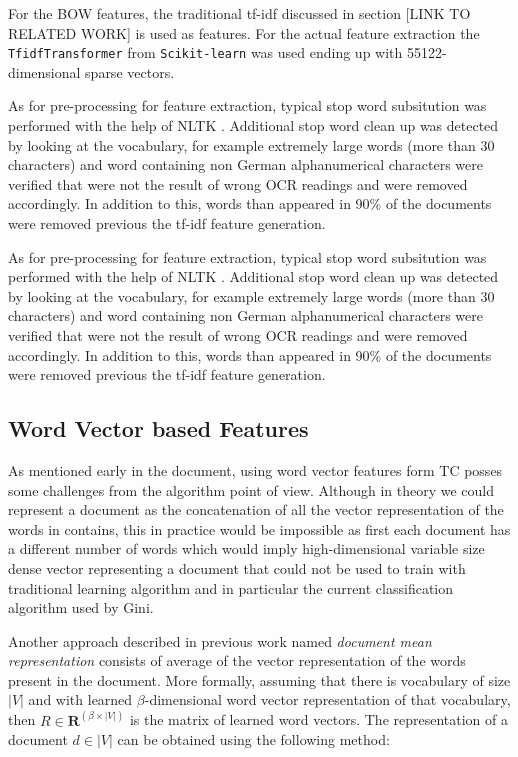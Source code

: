 For the \ac{BOW} features, the traditional \ac{tf-idf}  
\cite{Salton88term-weightingapproaches}\cite{Sebastiani02} discussed in
section [LINK TO RELATED WORK] is used as features. For the actual feature
extraction the \texttt{TfidfTransformer} from \texttt{Scikit-learn}
\cite{scikit-learn}  was used ending up with 55122-dimensional sparse
vectors.

As for  pre-processing for feature extraction,  typical stop word subsitution was performed with the help
of \ac{NLTK} \cite{BirdKleinLoper09}. Additional stop word clean up was
detected by looking at the vocabulary, for example extremely large words
(more than 30 characters) and word containing non German alphanumerical
characters were verified that were not the result of wrong OCR
readings and were removed accordingly. In addition to this, words than
appeared in 90\% of the documents were removed  previous the \ac{tf-idf}
feature generation.


As for  pre-processing for feature extraction,  typical stop word subsitution was performed with the help
of \ac{NLTK} \cite{BirdKleinLoper09}. Additional stop word clean up was
detected by looking at the vocabulary, for example extremely large words
(more than 30 characters) and word containing non German alphanumerical
characters were verified that were not the result of wrong OCR
readings and were removed accordingly. In addition to this, words than
appeared in 90\% of the documents were removed  previous the \ac{tf-idf}
feature generation.



\subsection{Word Vector  based Features}
\label{sec:sub_w2v4tc_w2v_based_features}

As mentioned early in the document, using word vector features form \ac{TC}
posses some challenges from the algorithm point of view. Although in theory
we could represent a document as the concatenation of all the vector
representation of the words in contains, this in practice would be impossible
as first each document has a different number of words which would imply
high-dimensional variable size dense vector representing a document that
could not be used to train with traditional learning algorithm and in
particular the current classification algorithm used by Gini.

Another approach described in previous work named \textit{document mean
  representation} consists of average of the vector representation of the  words
present in the document.  More formally, assuming that there is  vocabulary of
size $|V|$ and with learned $\beta$-dimensional word vector representation of
that vocabulary, then  $R  \in \mathbf{R}^{(\beta \times |V|)}$  is  the
matrix of learned word vectors.  The representation of a document $d \in |V|$ can be obtained using the following method:


